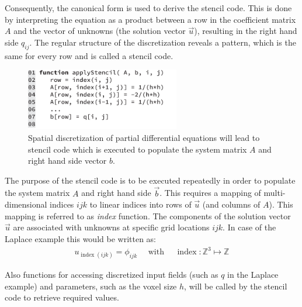 Consequently, the canonical form is used to derive the stencil code. This is done by interpreting the equation as a product between a row in the coefficient matrix $A$ and the vector of unknowns (the solution vector $\vec{u}$), resulting in the right hand side $q_{ij}$. The regular structure of the discretization reveals a pattern, which is the same for every row and is called a stencil code.

\begin{figure}[h]
\centering
\includegraphics[width=0.6\textwidth]{04_pn_method/figures/fig_code_stencil.pdf}
\caption{Spatial discretization of partial differential equations will lead to stencil code which is executed to populate the system matrix $A$ and right hand side vector $b$.}
\label{fig:pn_solver_stencil_code}
\end{figure}

The purpose of the stencil code is to be executed repeatedly in order to populate the system matrix $A$ and right hand side $\vec{b}$. This requires a mapping of multi-dimensional indices $ijk$ to linear indices into rows of $\vec{u}$ (and columns of $A$). This mapping is referred to as \emph{index} function. The components of the solution vector $\vec{u}$ are associated with unknowns at specific grid locations $ijk$. In case of the Laplace example this would be written as:
\begin{align}
u_{\operatorname{index}\left(ijk\right)} = \phi_{ijk}\quad\text{ with }\quad \operatorname{index}: \mathbb{Z}^3\mapsto\mathbb{Z}
\label{eq:pn_index_mapping}
\end{align}

Also functions for accessing discretized input fields (such as $q$ in the Laplace example) and parameters, such as the voxel size $h$, will be called by the stencil code to retrieve required values.

